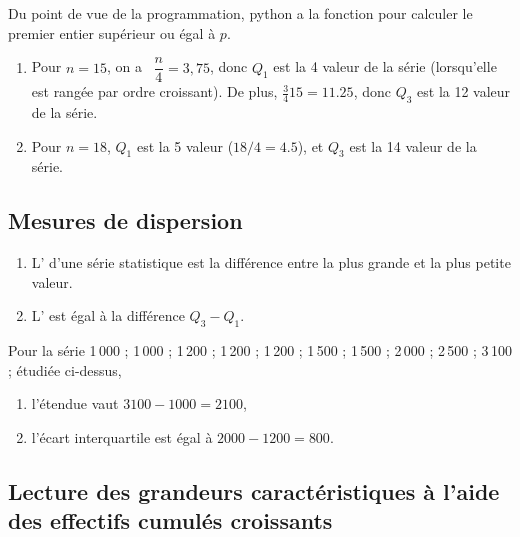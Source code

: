 Du point de vue de la programmation, python a la fonction  pour calculer le premier entier supérieur ou égal à \( p\).



  \begin{example}
  \begin{enumerate}
  \item Pour $n=15$, on a \ $\dfrac{n}4 = 3,75$, donc $Q_1$ est la
    4\ieme{} valeur de la série (lorsqu'elle est rangée par ordre
    croissant). 
    De plus, \( \frac{ 3 }{ 4 }15=11.25\), donc $Q_3$ est la 12 valeur de la
    série. 
  \item Pour $n=18$, $Q_1$ est la 5 valeur (\( 18/4=4.5\)), et $Q_3$ est la 14 valeur de la série.
\end{enumerate}
      
  \end{example}

\subsection{Mesures de dispersion}


\begin{enumerate}
    \item L' d'une série statistique est la différence entre
  la plus grande et la plus petite valeur.
\item L' est égal à la différence $Q_3-Q_1$.
\end{enumerate}


\begin{example}
Pour la série  1\,000 ; 1\,000 ; 1\,200 ; 1\,200 ; 1\,200 ; 1\,500 ; 1\,500 ;
  2\,000 ; 2\,500 ; 3\,100 ; étudiée ci-dessus, 
  \begin{enumerate}
  \item l'étendue vaut \( 3100-1000=2100\),
  \item l'écart interquartile est égal à \( 2000-1200=800\).
  \end{enumerate}
\end{example}

\subsection{Lecture des grandeurs caractéristiques à l'aide des
  effectifs cumulés croissants}


